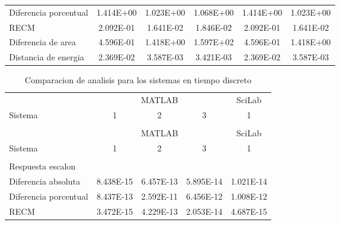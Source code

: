 {\begin{longtable}{l @{\extracolsep{\fill}} ccccc}
            Diferencia porcentual  & \num{1.414E+00} & \num{1.023E+00} & \num{1.068E+00} & \num{1.414E+00} & \num{1.023E+00}  \\
            RECM                   & \num{2.092E-01} & \num{1.641E-02} & \num{1.846E-02} & \num{2.092E-01} & \num{1.641E-02}  \\
            Diferencia de area     & \num{4.596E-01} & \num{1.418E+00} & \num{1.597E+02} & \num{4.596E-01} & \num{1.418E+00}  \\
            Distancia de energia   & \num{2.369E-02} & \num{3.587E-03} & \num{3.421E-03} & \num{2.369E-02} & \num{3.587E-03}  \\
        \end{longtable}}
        
        {\setlength\LTleft{0pt}
        \setlength\LTright{0pt}
        \scriptsize
        \centering
        \renewcommand{\arraystretch}{0.89}
        \begin{longtable}{l @{\extracolsep{\fill}} cccc}
            \caption[Comparacion de analisis - tiempo discreto]{Comparacion de analisis para los sistemas en tiempo discreto}
            \label{tab:AnalisisStepD} \\
            \toprule
                    & \multicolumn{3}{c}{MATLAB} & SciLab   \\ \cmidrule{2-4}\cmidrule{5-5}
            Sistema &   1     &    2     &    3  &   1      \\ \cmidrule{2-2}\cmidrule{3-3}\cmidrule{4-4}\cmidrule{5-5}
            & & & & \\
            \endfirsthead
            \toprule
                    & \multicolumn{3}{c}{MATLAB} & SciLab   \\ \cmidrule{2-4}\cmidrule{5-5}
            Sistema &   1     &    2     &    3  &   1      \\ \cmidrule{2-2}\cmidrule{3-3}\cmidrule{4-4}\cmidrule{5-5}
            & & & & \\
            \endhead
            \bottomrule
            \endfoot
            Respuesta escalon      & & & & \\ \cmidrule{1-1}
            Diferencia absoluta    & \num{8.438E-15} & \num{6.457E-13} & \num{5.895E-14} & \num{1.021E-14}  \\
            Diferencia porcentual  & \num{8.437E-13} & \num{2.592E-11} & \num{6.456E-12} & \num{1.008E-12}  \\
            RECM                   & \num{3.472E-15} & \num{4.229E-13} & \num{2.053E-14} & \num{4.687E-15}  \\

\end{longtable}}
